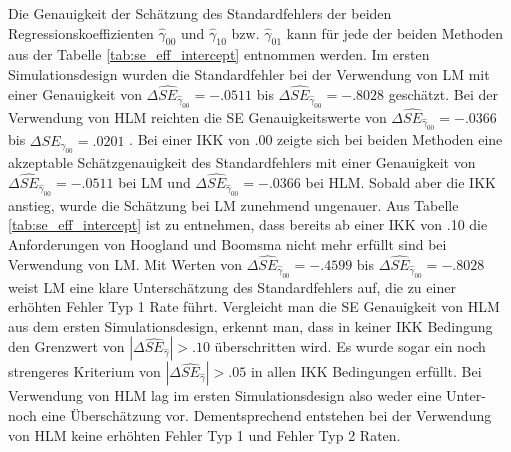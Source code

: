 \documentclass[12pt]{article}\usepackage[]{graphicx}\usepackage[]{color}
\begin{document}
Die Genauigkeit der Schätzung des Standardfehlers der beiden Regressionskoeffizienten $\widehat{\gamma}_{00}$ und $\widehat{\gamma}_{10}$ bzw. $\widehat{\gamma}_{01}$ kann für jede der beiden Methoden aus der Tabelle \ref{tab:se_eff_intercept} entnommen werden. Im ersten Simulationsdesign wurden die Standardfehler bei der Verwendung von LM mit einer Genauigkeit von $\Delta\widehat{SE}_{\widehat{\gamma}_{00}} = -.0511$ bis $\Delta\widehat{SE}_{\widehat{\gamma}_{00}} = -.8028$ geschätzt. Bei der Verwendung von HLM reichten die SE Genauigkeitswerte von $\Delta\widehat{SE}_{\widehat{\gamma}_{00}} = -.0366$ bis $\Delta\widehat{SE}_{\widehat{\gamma}_{00}} = .0201$ . Bei einer IKK von .00 zeigte sich bei beiden Methoden eine akzeptable Schätzgenauigkeit des Standardfehlers mit einer Genauigkeit von $\Delta\widehat{SE}_{\widehat{\gamma}_{00}} = -.0511$ bei LM und $\Delta\widehat{SE}_{\widehat{\gamma}_{00}} = -.0366$ bei HLM. Sobald aber die IKK anstieg, wurde die Schätzung bei LM zunehmend ungenauer. Aus Tabelle \ref{tab:se_eff_intercept} ist zu entnehmen, dass bereits ab einer IKK von .10 die Anforderungen von Hoogland und Boomsma \citeyearpar{hooglandboosma1998robustness} nicht mehr erfüllt sind bei Verwendung von LM. Mit Werten von $\Delta\widehat{SE}_{\widehat{\gamma}_{00}} = -.4599$ bis $\Delta\widehat{SE}_{\widehat{\gamma}_{00}} = -.8028$ weist LM eine klare Unterschätzung des Standardfehlers auf, die zu einer erhöhten Fehler Typ 1 Rate führt. Vergleicht man die SE Genauigkeit von HLM aus dem ersten Simulationsdesign, erkennt man, dass in keiner IKK Bedingung den Grenzwert von $|\Delta\widehat{SE}_{\widehat{\gamma}}| > .10$ überschritten wird. Es wurde sogar ein noch strengeres Kriterium von $|\Delta\widehat{SE}_{\widehat{\gamma}}| > .05$ in allen IKK Bedingungen erfüllt. Bei Verwendung von HLM lag im ersten Simulationsdesign also weder eine Unter- noch eine Überschätzung vor. Dementsprechend entstehen bei der Verwendung von HLM keine erhöhten Fehler Typ 1 und Fehler Typ 2 Raten.
\end{document}
